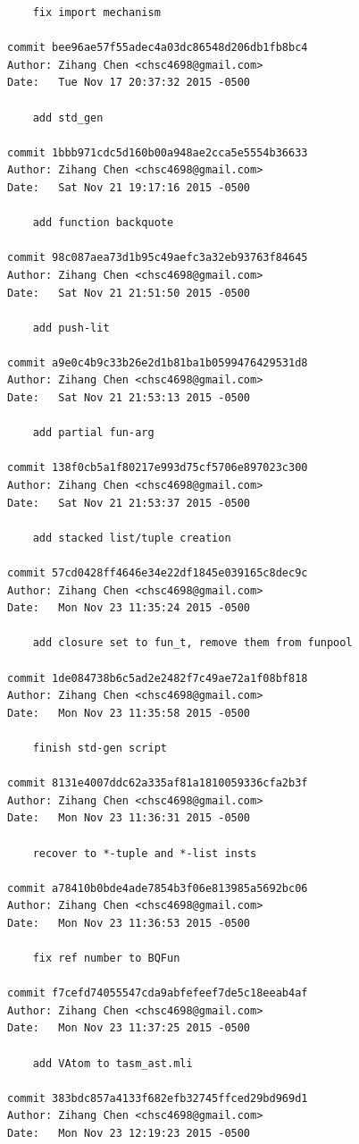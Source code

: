 \documentclass{report}
\begin{document}
\begin{appendices}
\begin{verbatim}
    fix import mechanism

commit bee96ae57f55adec4a03dc86548d206db1fb8bc4
Author: Zihang Chen <chsc4698@gmail.com>
Date:   Tue Nov 17 20:37:32 2015 -0500

    add std_gen

commit 1bbb971cdc5d160b00a948ae2cca5e5554b36633
Author: Zihang Chen <chsc4698@gmail.com>
Date:   Sat Nov 21 19:17:16 2015 -0500

    add function backquote

commit 98c087aea73d1b95c49aefc3a32eb93763f84645
Author: Zihang Chen <chsc4698@gmail.com>
Date:   Sat Nov 21 21:51:50 2015 -0500

    add push-lit

commit a9e0c4b9c33b26e2d1b81ba1b0599476429531d8
Author: Zihang Chen <chsc4698@gmail.com>
Date:   Sat Nov 21 21:53:13 2015 -0500

    add partial fun-arg

commit 138f0cb5a1f80217e993d75cf5706e897023c300
Author: Zihang Chen <chsc4698@gmail.com>
Date:   Sat Nov 21 21:53:37 2015 -0500

    add stacked list/tuple creation

commit 57cd0428ff4646e34e22df1845e039165c8dec9c
Author: Zihang Chen <chsc4698@gmail.com>
Date:   Mon Nov 23 11:35:24 2015 -0500

    add closure set to fun_t, remove them from funpool

commit 1de084738b6c5ad2e2482f7c49ae72a1f08bf818
Author: Zihang Chen <chsc4698@gmail.com>
Date:   Mon Nov 23 11:35:58 2015 -0500

    finish std-gen script

commit 8131e4007ddc62a335af81a1810059336cfa2b3f
Author: Zihang Chen <chsc4698@gmail.com>
Date:   Mon Nov 23 11:36:31 2015 -0500

    recover to *-tuple and *-list insts

commit a78410b0bde4ade7854b3f06e813985a5692bc06
Author: Zihang Chen <chsc4698@gmail.com>
Date:   Mon Nov 23 11:36:53 2015 -0500

    fix ref number to BQFun

commit f7cefd74055547cda9abfefeef7de5c18eeab4af
Author: Zihang Chen <chsc4698@gmail.com>
Date:   Mon Nov 23 11:37:25 2015 -0500

    add VAtom to tasm_ast.mli

commit 383bdc857a4133f682efb32745ffced29bd969d1
Author: Zihang Chen <chsc4698@gmail.com>
Date:   Mon Nov 23 12:19:23 2015 -0500


\end{verbatim}
\end{appendices}
\end{document}
